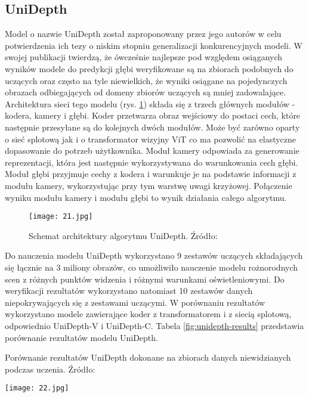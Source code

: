 \subsection{UniDepth}
Model o nazwie UniDepth \cite{piccinelli2024} został zaproponowany przez jego autorów w celu potwierdzenia ich tezy o niskim stopniu generalizacji konkurencyjnych modeli. W swojej publikacji twierdzą, że ówcześnie najlepsze pod względem osiąganych wyników modele do predykcji głębi weryfikowane są na zbiorach podobnych do uczących oraz często na tyle niewielkich, że wyniki osiągane na pojedynczych obrazach odbiegających od domeny zbiorów uczących są mniej zadowalające.
Architektura sieci tego modelu (rys. \ref{fig:unidepth-schema}) składa się z trzech głównych modułów - kodera, kamery i głębi. Koder przetwarza obraz wejściowy do postaci cech, które następnie przesyłane są do kolejnych dwóch modułów. Może być zarówno oparty o sieć splotową jak i o transformator wizyjny ViT co ma pozwolić na elastyczne dopasowanie do potrzeb użytkownika. Moduł kamery odpowiada za generowanie reprezentacji, która jest następnie wykorzystywana do warunkowania cech głębi. Moduł głębi przyjmuje cechy z kodera i warunkuje je na podstawie informacji z modułu kamery, wykorzystując przy tym warstwę uwagi krzyżowej. Połączenie wyniku modułu kamery i modułu głębi to wynik działania całego algorytmu.
\begin{figure}[H]
    \centering
    \texttt{[image: 21.jpg]}
    \caption{Schemat architektury algorytmu UniDepth. Źródło: \cite{piccinelli2024}}
    \label{fig:unidepth-schema}
\end{figure}
Do nauczenia modelu UniDepth wykorzystano 9 zestawów uczących składających się łącznie na 3 miliony obrazów, co umożliwiło nauczenie modelu rożnorodnych scen z różnych punktów widzenia i różnymi warunkami oświetleniowymi. Do weryfikacji rezultatów wykorzystano natomiast 10 zestawów danych niepokrywających się z zestawami uczącymi. W porównaniu rezultatów wykorzystano modele zawierające koder z transformatorem i z siecią splotową, odpowiednio UniDepth-V i UniDepth-C. Tabela \ref{fig:unidepth-results} przedstawia porównanie rezultatów modelu UniDepth.
\begin{table}[H]
    \centering
    \caption{Porównanie rezultatów UniDepth dokonane na zbiorach danych niewidzianych podczas uczenia. Źródło: \cite{piccinelli2024}}
    \texttt{[image: 22.jpg]}
    \label{fig:unidepth-results}
\end{table}


